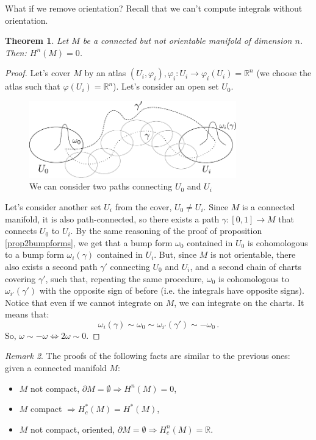 \documentclass[a4paper,11pt,titlepage, article, oneside]{memoir}
\numberwithin{equation}{section}
\newtheorem{theorem}{Theorem}[section]
\theoremstyle{definition}
\theoremstyle{remark}
\newtheorem{remark}[theorem]{Remark}
\newcommand{\rfield}{\mathbb{R}}
\begin{document}
What if we remove orientation? Recall that we can't compute integrals without orientation.
\begin{theorem}
Let $M$ be a connected but not orientable manifold of dimension $n$. Then: $H^n(M) = 0$.
\end{theorem}
\begin{proof}
Let's cover $M$ by an atlas $(U_i, \varphi_i), \varphi_i \colon U_i \rightarrow \varphi_i(U_i) = \rfield^n$ (we choose the atlas such that $\varphi(U_i) = \rfield^n$). Let's consider an open set $U_0$.
\begin{figure}[H] \label{Fig:bumpforms3}
     \centering
     \includegraphics[width=0.8\textwidth]{Images/bumpforms3.pdf}
     \caption{We can consider two paths connecting $U_0$ and $U_i$}
\end{figure}
Let's consider another set $U_i$ from the cover, $U_0 \not = U_i$. Since $M$ is a connected manifold, it is also path-connected, so there exists a path $\gamma \colon [0, 1] \rightarrow M$ that connects $U_0$ to $U_i$. By the same reasoning of the proof of proposition \ref{prop2bumpforms}, we get that a bump form $\omega_0$ contained  in $U_0$ is cohomologous to a bump form $\omega_i(\gamma)$ contained in $U_i$. But, since $M$ is not orientable, there also exists a second path $\gamma'$ connecting $U_0$ and $U_i$, and a second chain of charts covering $\gamma'$, such that, repeating the same procedure, $\omega_0$ is cohomologous to $\omega_{i'}(\gamma')$ with the opposite sign of before (i.e. the integrals have opposite signs). Notice that even if we cannot integrate on $M$, we can integrate on the charts. It means that:
\[ \omega_i(\gamma) \sim \omega_0 \sim \omega_{i'}(\gamma') \sim -\omega_0 \, . \]
So, $\omega \sim - \omega \Leftrightarrow 2 \omega \sim 0$.
\end{proof}

\begin{remarkbox}\begin{remark}
The proofs of the following facts are similar to the previous ones: given a connected manifold $M$:
\begin{itemize}
\item $M$ not compact, $\partial M = \emptyset \Rightarrow H^n(M)=0$,
\item $M$ compact $\Rightarrow H_c^*(M) = H^*(M)$,
\item $M$ not compact, oriented, $\partial M= \emptyset \Rightarrow H^n_c(M)=\rfield$.
\end{itemize}
\end{remark}\end{remarkbox}
\end{document}
